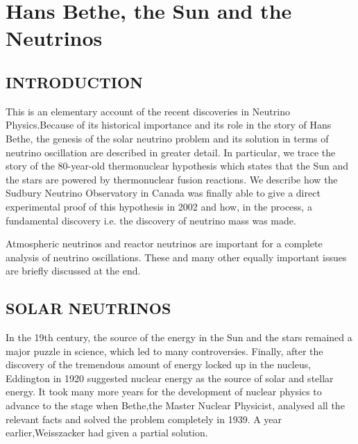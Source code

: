 \chapter{Hans Bethe, the Sun and the Neutrinos}\label{chap4}


\section{INTRODUCTION}

This is an elementary account of the recent
discoveries in Neutrino Physics.Because of its historical
importance and its role in the story of Hans Bethe, 
the genesis of the solar neutrino problem and
its solution in terms of neutrino oscillation are described
in greater detail. In particular, we trace the story of the
80-year-old thermonuclear hypothesis which states that the
Sun and the stars are powered by thermonuclear fusion reactions.
We describe how the Sudbury Neutrino Observatory in Canada was
finally able to give a direct experimental proof of this
hypothesis in 2002 and how, in the process, a fundamental
discovery i.e. the discovery of neutrino mass was made.

Atmospheric neutrinos and reactor neutrinos
are important for a complete analysis of neutrino oscillations.
These and many other equally important issues are briefly
discussed at the end.

\section{SOLAR NEUTRINOS}

In the 19th century, the source of the energy in the Sun
and the stars remained a major puzzle in science, which
led to many controversies. Finally, after the
discovery of the tremendous amount of energy locked up
in the nucleus, Eddington in 1920 suggested nuclear energy as
the source of solar and stellar energy. It took
many more years for the development of nuclear physics
to advance to the stage when Bethe,the Master Nuclear 
Physicist, analysed all the
relevant facts and solved the problem completely in 1939.
A year earlier,Weisszacker had given a partial solution.

